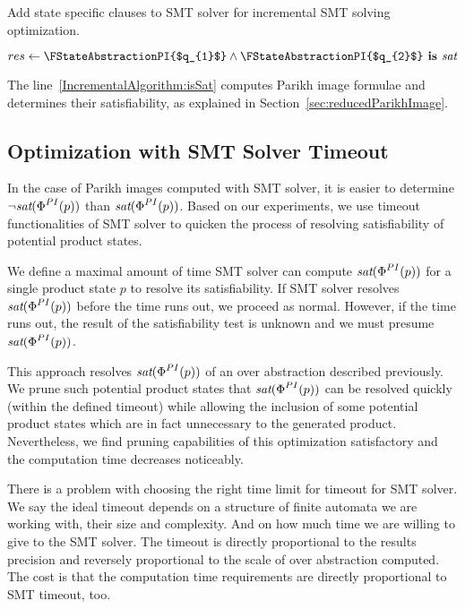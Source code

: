 \begin{algorithm}
\caption{Add state specific clauses to SMT solver for incremental SMT solving optimization.}\label{productConstructionParikhImageAlgorithmAddPersistentClauses}

\DontPrintSemicolon
\FSMTSolverPush{} \;
$res \gets \FStateAbstractionPI{$q_{1}$} \land \FStateAbstractionPI{$q_{2}$} \textbf{ is } \emph{sat} $ \;\label{IncrementalAlgorithm:isSat}
\FSMTSolverPop{} \;
\end{algorithm}

The line~\ref{IncrementalAlgorithm:isSat} computes Parikh image formulae and determines their satisfiability, as explained in Section~\ref{sec:reducedParikhImage}.


\subsection{Optimization with SMT Solver Timeout}

In the case of Parikh images computed with SMT solver, it is easier to determine $\neg \emph{sat}(\emph{$\Phi$}^{PI}(p))$ than $\emph{sat}(\emph{$\Phi$}^{PI}(p))$. Based on our experiments, we use timeout functionalities of SMT solver to quicken the process of resolving satisfiability of potential product states.

We define a maximal amount of time SMT solver can compute $\emph{sat}(\emph{$\Phi$}^{PI}(p))$ for a single product state $p$ to resolve its satisfiability. If SMT solver resolves $\emph{sat}(\emph{$\Phi$}^{PI}(p))$ before the time runs out, we proceed as normal. However, if the time runs out, the result of the satisfiability test is unknown and we must presume $\emph{sat}(\emph{$\Phi$}^{PI}(p))$.

This approach resolves $\emph{sat}(\emph{$\Phi$}^{PI}(p))$ of an over abstraction described previously. We prune such potential product states that $\emph{sat}(\emph{$\Phi$}^{PI}(p))$ can be resolved quickly (within the defined timeout) while allowing the inclusion of some potential product states which are in fact unnecessary to the generated product. Nevertheless, we find pruning capabilities of this optimization satisfactory and the computation time decreases noticeably.

There is a problem with choosing the right time limit for timeout for SMT solver. We say the ideal timeout depends on a structure of finite automata we are working with, their size and complexity. And on how much time we are willing to give to the SMT solver. The timeout is directly proportional to the results precision and reversely proportional to the scale of over abstraction computed. The cost is that the computation time requirements are directly proportional to SMT timeout, too.

